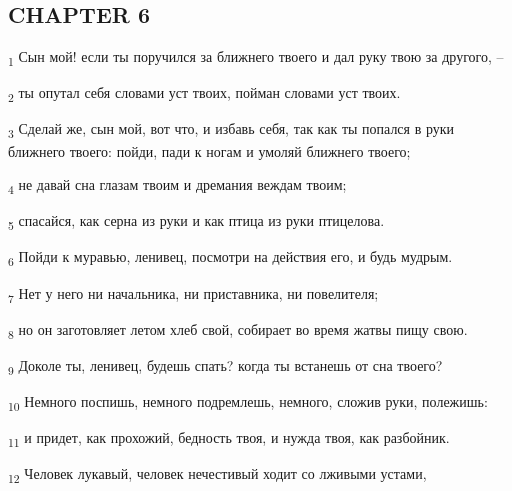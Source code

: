 \subsection{CHAPTER 6}
\begin{tcolorbox}
\textsubscript{1} Сын мой! если ты поручился за ближнего твоего и дал руку твою за другого, --
\end{tcolorbox}
\begin{tcolorbox}
\textsubscript{2} ты опутал себя словами уст твоих, пойман словами уст твоих.
\end{tcolorbox}
\begin{tcolorbox}
\textsubscript{3} Сделай же, сын мой, вот что, и избавь себя, так как ты попался в руки ближнего твоего: пойди, пади к ногам и умоляй ближнего твоего;
\end{tcolorbox}
\begin{tcolorbox}
\textsubscript{4} не давай сна глазам твоим и дремания веждам твоим;
\end{tcolorbox}
\begin{tcolorbox}
\textsubscript{5} спасайся, как серна из руки и как птица из руки птицелова.
\end{tcolorbox}
\begin{tcolorbox}
\textsubscript{6} Пойди к муравью, ленивец, посмотри на действия его, и будь мудрым.
\end{tcolorbox}
\begin{tcolorbox}
\textsubscript{7} Нет у него ни начальника, ни приставника, ни повелителя;
\end{tcolorbox}
\begin{tcolorbox}
\textsubscript{8} но он заготовляет летом хлеб свой, собирает во время жатвы пищу свою.
\end{tcolorbox}
\begin{tcolorbox}
\textsubscript{9} Доколе ты, ленивец, будешь спать? когда ты встанешь от сна твоего?
\end{tcolorbox}
\begin{tcolorbox}
\textsubscript{10} Немного поспишь, немного подремлешь, немного, сложив руки, полежишь:
\end{tcolorbox}
\begin{tcolorbox}
\textsubscript{11} и придет, как прохожий, бедность твоя, и нужда твоя, как разбойник.
\end{tcolorbox}
\begin{tcolorbox}
\textsubscript{12} Человек лукавый, человек нечестивый ходит со лживыми устами,
\end{tcolorbox}
